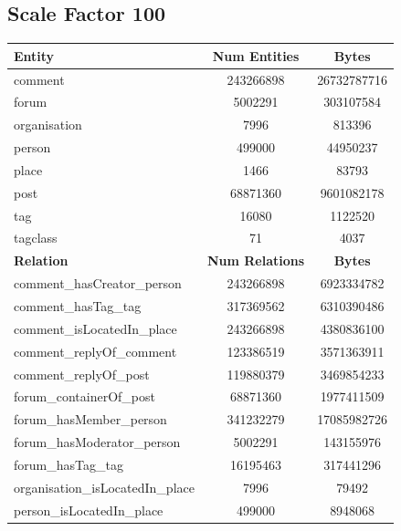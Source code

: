 \subsection{Scale Factor 100}
\begin{table}[H]
    \centering
    \begin{tabular} {| l | c | c |}
        \hline
        \textbf{Entity} & \textbf{Num Entities} & \textbf{Bytes} \\
        \hline
        \hline
        comment & 243266898 & 26732787716 \\
        \hline
        forum & 5002291 & 303107584 \\
        \hline
        organisation & 7996 & 813396 \\
        \hline
        person & 499000 & 44950237 \\
        \hline
        place & 1466 & 83793 \\
        \hline
        post & 68871360 & 9601082178 \\
        \hline
        tag & 16080 & 1122520 \\
        \hline
        tagclass & 71 & 4037 \\
        \hline
        \hline
        \textbf{Relation} & \textbf{Num Relations} & \textbf{Bytes} \\
        \hline
        \hline
        comment\_hasCreator\_person & 243266898 & 6923334782 \\
        \hline
        comment\_hasTag\_tag & 317369562 & 6310390486 \\
        \hline
        comment\_isLocatedIn\_place & 243266898 & 4380836100 \\
        \hline
        comment\_replyOf\_comment & 123386519 & 3571363911 \\
        \hline
        comment\_replyOf\_post & 119880379 & 3469854233 \\
        \hline
        forum\_containerOf\_post & 68871360 & 1977411509 \\
        \hline
        forum\_hasMember\_person & 341232279 & 17085982726 \\
        \hline
        forum\_hasModerator\_person & 5002291 & 143155976 \\
        \hline
        forum\_hasTag\_tag & 16195463 & 317441296 \\
        \hline
        organisation\_isLocatedIn\_place & 7996 & 79492 \\
        \hline
        person\_isLocatedIn\_place & 499000 & 8948068 \\

\end{tabular}
\end{table}
